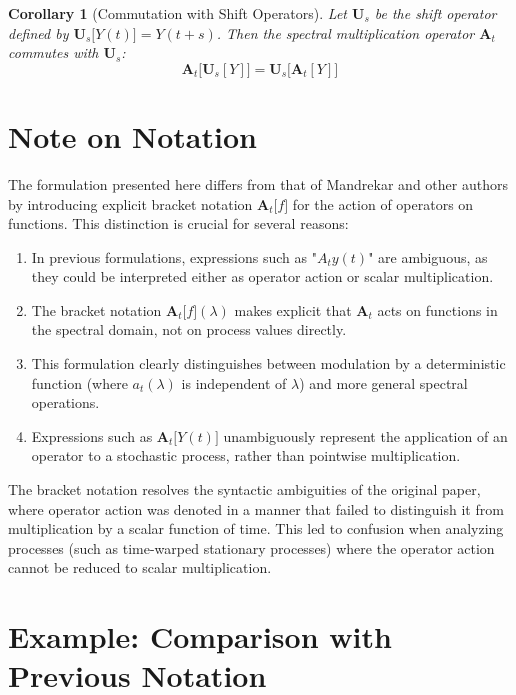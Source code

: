 \documentclass{article}
\newtheorem{corollary}[theorem]{Corollary}
\begin{document}
\begin{corollary}[Commutation with Shift Operators]
Let $\mathbf{U}_s$ be the shift operator defined by $\mathbf{U}_s\big[Y(t)\big] = Y(t+s)$. Then the spectral multiplication operator $\mathbf{A}_t$ commutes with $\mathbf{U}_s$:
\begin{equation}
\mathbf{A}_t\big[\mathbf{U}_s[Y]\big] = \mathbf{U}_s\big[\mathbf{A}_t[Y]\big]
\end{equation}
\end{corollary}

\section{Note on Notation}

The formulation presented here differs from that of Mandrekar and other authors by introducing explicit bracket notation $\mathbf{A}_t\big[f\big]$ for the action of operators on functions. This distinction is crucial for several reasons:

\begin{enumerate}
\item In previous formulations, expressions such as "$A_t y(t)$" are ambiguous, as they could be interpreted either as operator action or scalar multiplication.
\item The bracket notation $\mathbf{A}_t\big[f\big](\lambda)$ makes explicit that $\mathbf{A}_t$ acts on functions in the spectral domain, not on process values directly.
\item This formulation clearly distinguishes between modulation by a deterministic function (where $a_t(\lambda)$ is independent of $\lambda$) and more general spectral operations.
\item Expressions such as $\mathbf{A}_t\big[Y(t)\big]$ unambiguously represent the application of an operator to a stochastic process, rather than pointwise multiplication.
\end{enumerate}

The bracket notation resolves the syntactic ambiguities of the original paper, where operator action was denoted in a manner that failed to distinguish it from multiplication by a scalar function of time. This led to confusion when analyzing processes (such as time-warped stationary processes) where the operator action cannot be reduced to scalar multiplication.

\section{Example: Comparison with Previous Notation}
\end{document}
